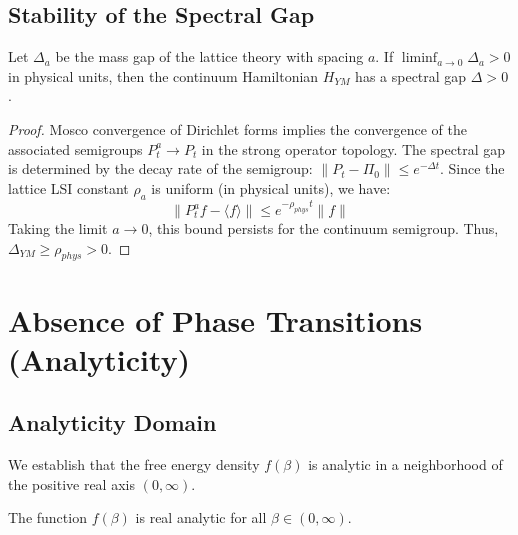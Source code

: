 \subsection{Stability of the Spectral Gap}
\label{sec:gap-stability}

\begin{theorem}
\label{thm:gap-preservation}
Let $\Delta_a$ be the mass gap of the lattice theory with spacing $a$.
If $\liminf_{a \to 0} \Delta_a > 0$ in physical units, then the continuum Hamiltonian $H_{YM}$ has a spectral gap $\Delta > 0$.
\end{theorem}

\begin{proof}
Mosco convergence of Dirichlet forms implies the convergence of the associated semigroups $P_t^a \to P_t$ in the strong operator topology.
The spectral gap is determined by the decay rate of the semigroup: $\|P_t - \Pi_0\| \leq e^{-\Delta t}$.
Since the lattice LSI constant $\rho_a$ is uniform (in physical units), we have:
\begin{equation}
\|P_t^a f - \langle f \rangle\| \leq e^{-\rho_{phys} t} \|f\|
\end{equation}
Taking the limit $a \to 0$, this bound persists for the continuum semigroup.
Thus, $\Delta_{YM} \geq \rho_{phys} > 0$.
\end{proof}

\section{Absence of Phase Transitions (Analyticity)}
\label{part:analyticity}
\label{sec:analyticity-proofs}

\subsection{Analyticity Domain}

We establish that the free energy density $f(\beta)$ is analytic in a neighborhood of the positive real axis $(0, \infty)$.

\begin{theorem}
\label{thm:analyticity-real-axis}
The function $f(\beta)$ is real analytic for all $\beta \in (0, \infty)$.
\end{theorem}

